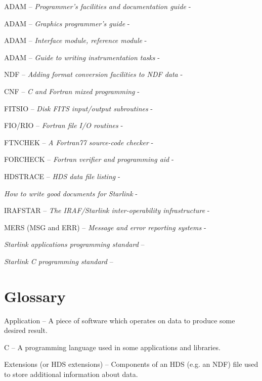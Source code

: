 \documentclass[11pt,nolof]{starlink}
\begin{document}
ADAM -- \emph{Programmer's facilities and documentation guide} - 

ADAM -- \emph{Graphics programmer's guide} - 

ADAM -- \emph{Interface module, reference module} - 

ADAM -- \emph{Guide to writing instrumentation tasks} -

NDF -- \emph{Adding format conversion facilities to NDF data} -

CNF -- \emph{C and Fortran mixed programming} - 

FITSIO -- \emph{Disk FITS input/output subroutines} - 

FIO/RIO -- \emph{Fortran file I/O routines} - 

FTNCHEK -- \emph{A Fortran77 source-code checker} - 

FORCHECK -- \emph{Fortran verifier and programming aid} -

HDSTRACE -- \emph{HDS data file listing}  - 

\emph{How to write good documents for Starlink} - 

IRAFSTAR -- \emph{The IRAF/Starlink inter-operability infrastructure} -

MERS (MSG and ERR) -- \emph{Message and error reporting systems} -

\emph{Starlink applications programming standard} -- 

\emph{Starlink C programming standard} -- 

\section{Glossary}

\textsf{Application} -- A piece of software which operates on data to
produce some desired result.

\textsf{C} -- A programming language used in some applications and libraries.

\textsf{Extensions (or HDS extensions)} -- Components of an HDS (e.g. an
NDF) file used to store additional information about data.
\end{document}
